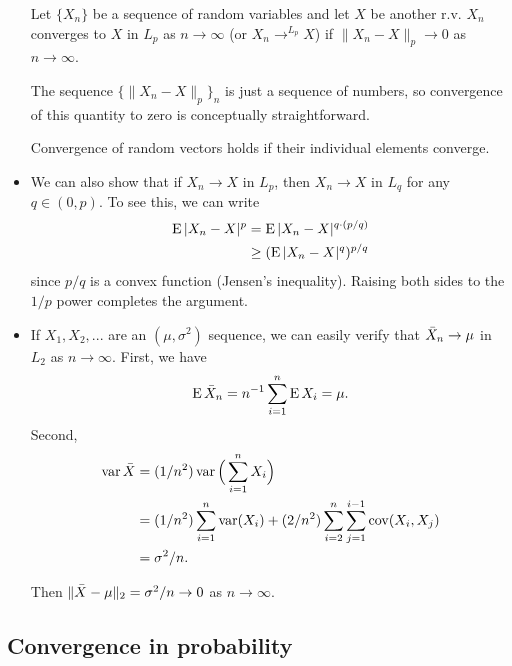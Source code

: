 \begin{itemize}[leftmargin=0pt]
  \begin{defn}
    Let $\{X_n\}$ be a sequence of random variables and let $X$ be
    another r.v.  $X_n$ converges to $X$ in $L_p$ as $n \to \infty$ (or $X_n
    \to^{L_p} X$) if $\lVert X_n - X \rVert_p \to 0$ as $n \to \infty$.
  \end{defn}
  The sequence $\{\lVert X_n - X \rVert_p\}_n$ is just a sequence of
  numbers, so convergence of this quantity to zero is conceptually
  straightforward.

  Convergence of random vectors holds if their individual elements
  converge.

\item We can also show that if $X_n \to X$ in $L_p$, then $X_n \to X$ in
  $L_q$ for any $q \in (0, p)$.  To see this, we can write
  \begin{align*}
    \operatorname{E} | X_n - X |^p
    &= \operatorname{E} | X_n - X |^{q \cdot (p/q)} \\
    &\geq (\operatorname{E} | X_n - X |^{q})^{p/q}
  \end{align*}
  since $p/q$ is a convex function (Jensen's inequality).  Raising
  both sides to the $1/p$ power completes the argument.

\item If $X_1, X_2,...$ are an \iid$(\mu, \sigma^2)$ sequence, we can easily
  verify that $\bar{X}_n \to \mu$ in $L_2$ as $n \to \infty$.  First, we have
  \begin{equation*}
    \operatorname{E} \bar{X}_n = n^{-1} \sum_{i=1}^n \operatorname{E} X_i = \mu.
  \end{equation*}
  Second,
  \begin{align*}
    \operatorname{var} \bar{X} &= (1/n^2) \operatorname{var}\Big( \sum_{i=1}^n X_i \Big)\\
    &= (1/n^2) \sum_{i=1}^n \operatorname{var}(X_i) + (2/n^2) \sum_{i=2}^n \sum_{j=1}^{i-1} \operatorname{cov}(X_i, X_j) \\
    &= \sigma^2 / n.
  \end{align*}
  
  Then $\lVert \bar{X} - \mu \rVert_2 = \sigma^2/n \to 0$ as $n \to \infty$.
  
\end{itemize}

\subsection{Convergence in probability}

